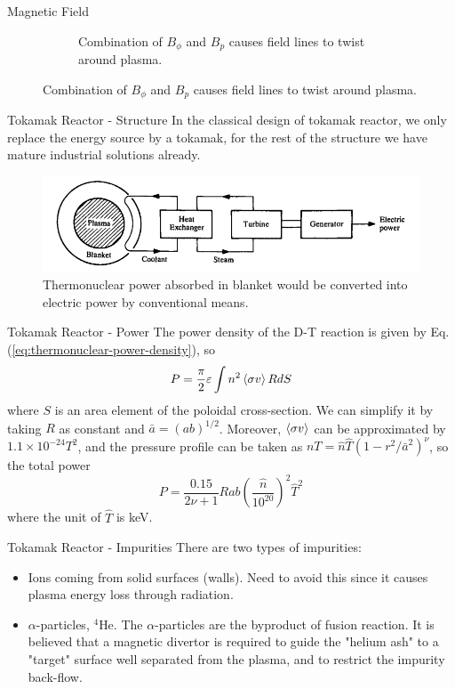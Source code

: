 \begin{frame}{Magnetic Field}
\begin{figure}
\begin{subfigure}{0.45\textwidth}
            \caption{Combination of $B_\phi$ and $B_p$ causes field lines to twist around plasma.}
        \end{subfigure}
    \end{figure}
\end{frame}

\begin{frame}{Tokamak Reactor - Structure}
    In the classical design of tokamak reactor, we only replace the energy source by a tokamak, for the rest of the structure we have mature industrial solutions already.
    \begin{figure}
        \centering
        \includegraphics[width=\textwidth]{figures/tokamak-reactor.png}
        \caption{Thermonuclear power absorbed in blanket would be converted into electric power by conventional means.}
    \end{figure}
\end{frame}

\begin{frame}{Tokamak Reactor - Power}
    The power density of the D-T reaction is given by Eq.(\ref{eq:thermonuclear-power-density}), so
    \begin{equation}
        P = \frac{\pi}{2}\varepsilon \int n^2\expval{\sigma v}R dS
    \end{equation}
    where $S$ is an area element of the poloidal cross-section. We can simplify it by taking $R$ as constant and $\bar{a}=(ab)^{1/2}$. Moreover, $\expval{\sigma v}$ can be approximated by $1.1\times 10^{-24} T^2$, and the pressure profile can be taken as $nT = \hat{n}\hat{T}(1-r^2/\bar{a}^2)^\nu$, so the total power
    \begin{equation}
        P = \frac{0.15}{2\nu+1}Rab\left(\frac{\hat{n}}{10^20}\right)^2\hat{T}^2
    \end{equation}
    where the unit of $\hat{T}$ is keV.
\end{frame}

\begin{frame}{Tokamak Reactor - Impurities}
    There are two types of impurities:
    \begin{itemize}
        \item Ions coming from solid surfaces (walls). Need to avoid this since it causes plasma energy loss through radiation.
        \item $\alpha$-particles, $^4$He. The $\alpha$-particles are the byproduct of fusion reaction. It is believed that a magnetic divertor is required to guide the "helium ash" to a "target" surface well separated from the plasma, and to restrict the impurity back-flow.
    \end{itemize}
\end{frame}
